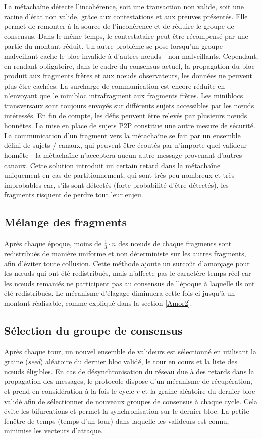 \documentclass[journal]{IEEEtran}
\begin{document}
La métachaîne détecte l'incohérence, soit une transaction non valide, soit une racine d'état non valide, grâce aux contestations et aux preuves présentés. Elle permet de remonter à la source de l'incohérence et de réduire le groupe de consensus. Dans le même temps, le contestataire peut être récompensé par une partie du montant réduit. Un autre problème se pose lorsqu'un groupe malveillant cache le bloc invalide à d'autres nœuds - non malveillants. Cependant, en rendant obligatoire, dans le cadre du consensus actuel, la propagation du bloc produit aux fragments frères et aux nœuds observateurs, les données ne peuvent plus être cachées. La surcharge de communication est encore réduite en n'envoyant que le minibloc intrafragment aux fragments frères. Les miniblocs transversaux sont toujours envoyés sur différents sujets accessibles par les nœuds intéressés. En fin de compte, les défis peuvent être relevés par plusieurs nœuds honnêtes. La mise en place de sujets P2P constitue une autre mesure de sécurité. La communication d’un fragment vers la métachaîne se fait par un ensemble défini de sujets / canaux, qui peuvent être écoutés par n'importe quel valideur honnête - la métachaîne n'acceptera aucun autre message provenant d'autres canaux. Cette solution introduit un certain retard dans la métachaîne uniquement en cas de partitionnement, qui sont très peu nombreux et très improbables car, s'ils sont détectés (forte probabilité d'être détectés), les fragments risquent de perdre tout leur enjeu.

\subsection{Mélange des fragments}
Après chaque époque, moins de $\frac{1}{3}  \cdot n$  des nœuds de chaque fragments sont redistribués de manière uniforme et non déterministe sur les autres fragments, afin d'éviter toute collusion. Cette méthode ajoute un surcoût d'amorçage pour les nœuds qui ont été redistribués, mais n'affecte pas le caractère temps réel car les nœuds remaniés ne participent pas au consensus de l'époque à laquelle ils ont été redistribués. Le mécanisme d'élagage diminuera cette fois-ci jusqu'à un montant réalisable, comme expliqué dans la section  \ref{Amor2}.

\subsection{Sélection du groupe de consensus}
Après chaque tour, un nouvel ensemble de valideurs est sélectionné en utilisant la graine (\textit{seed}) aléatoire du dernier bloc validé, le tour en cours et la liste des nœuds éligibles. En cas de désynchronisation du réseau due à des retards dans la propagation des messages, le protocole dispose d'un mécanisme de récupération, et prend en considération à la fois le cycle $r$ et la graine aléatoire du dernier bloc validé afin de sélectionner de nouveaux groupes de consensus à chaque cycle. Cela évite les bifurcations et permet la synchronisation sur le dernier bloc. La petite fenêtre de temps (temps d’un tour) dans laquelle les valideurs est connu, minimise les vecteurs d'attaque.
\end{document}

